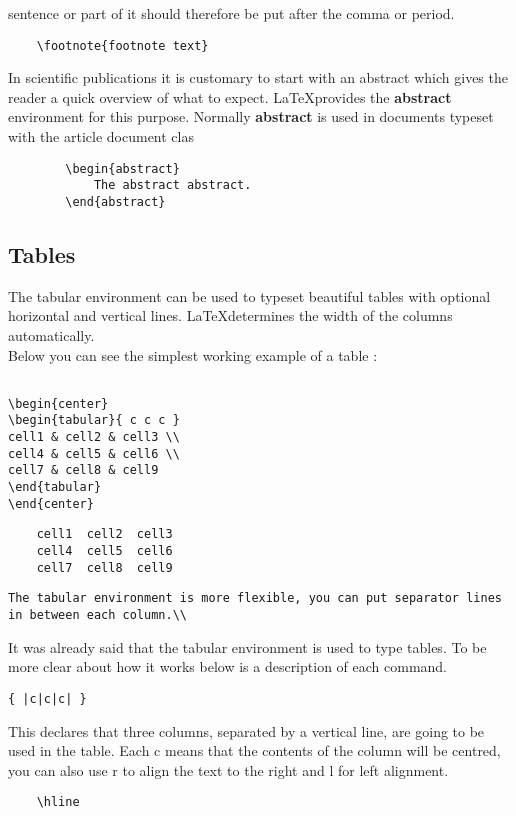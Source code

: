 	sentence or part of it should therefore be put after the comma or period.
	\begin{verbatim}
	\footnote{footnote text}
	\end{verbatim}
	In scientific publications it is customary to start with an abstract which gives
	the reader a quick overview of what to expect. \LaTeX provides the \textbf{abstract}
	environment for this purpose. Normally \textbf{abstract} is used in documents
	typeset with the article document clas
	\begin{verbatim}
		\begin{abstract}
			The abstract abstract.
		\end{abstract}
	\end{verbatim}
	
\subsection{Tables}
The tabular environment can be used to typeset beautiful tables with
optional horizontal and vertical lines. \LaTeX determines the width of the
columns automatically.\\

Below you can see the simplest working example of a table :

\begin{verbatim}

\begin{center}
\begin{tabular}{ c c c }
cell1 & cell2 & cell3 \\ 
cell4 & cell5 & cell6 \\  
cell7 & cell8 & cell9    
\end{tabular}
\end{center}

\end{verbatim}

\begin{verbatim}
	cell1  cell2  cell3
	cell4  cell5  cell6
	cell7  cell8  cell9
\end{verbatim}
\begin{verbatim}
The tabular environment is more flexible, you can put separator lines in between each column.\\
\end{verbatim}

It was already said that the tabular environment is used to type tables. To be more clear about how it works below is a description of each command.
\begin{verbatim}
{ |c|c|c| }
\end{verbatim}
This declares that three columns, separated by a vertical line, are going to be used in the table. Each c means that the contents of the column will be centred, you can also use r to align the text to the right and l for left alignment. 
\begin{verbatim}
	\hline
\end{verbatim}

